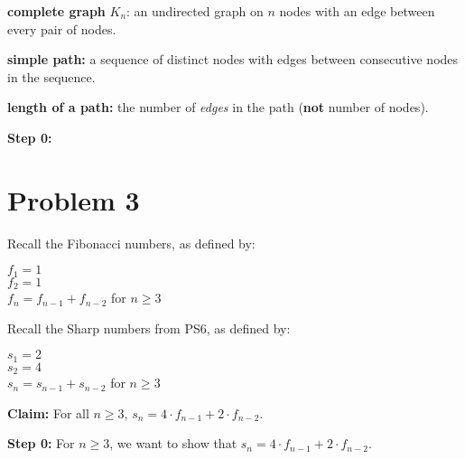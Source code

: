 \documentclass{article}
\begin{document}
\vspace{10pt}

\textbf{complete graph} $K_n$: an undirected graph on $n$ nodes with an edge between every pair of nodes.
\vspace{5pt}

\textbf{simple path:} a sequence of distinct nodes with edges between consecutive nodes in the sequence.
\vspace{5pt}

\textbf{length of a path:} the number of \textit{edges} in the path (\textbf{not} number of nodes).
\vspace{5pt}


\textbf{Step 0:}


\pagebreak

\section{Problem 3}

Recall the Fibonacci numbers, as defined by:
\begin{center}
    \begin{minipage}{0.5\textwidth} %
        \raggedright %
        $f_1=1$ \\
        $f_2=1$ \\
        $f_n=f_{n-1}+f_{n-2}$ for $n\geq 3$
    \end{minipage}
\end{center}
\vspace{10pt}

\noindent Recall the Sharp numbers from PS6, as defined by:
\begin{center}
    \begin{minipage}{0.5\textwidth} %
        \raggedright %
		$s_1=2$ \\
		$s_2=4$ \\
		$s_n=s_{n-1}+s_{n-2}$ for $n\geq 3$
    \end{minipage}
\end{center}
\vspace{15pt}

\noindent\textbf{Claim:} For all $n\geq 3$, $s_n=4\cdot f_{n-1}+2\cdot f_{n-2}$.

\vspace{15pt}

\noindent\textbf{Step 0:} For $n\geq 3$, we want to show that $s_n=4\cdot f_{n-1}+2\cdot f_{n-2}$.
\vspace{15pt}
\end{document}
